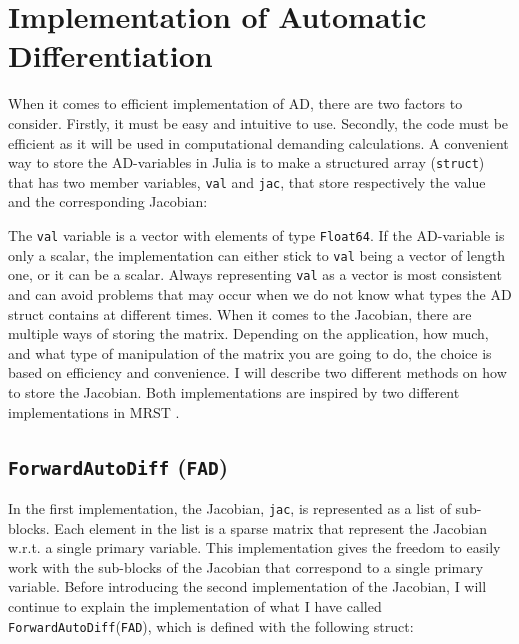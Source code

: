 \section{Implementation of Automatic Differentiation}
\label{sec:ImplementationAD}
When it comes to efficient implementation of AD, there are two factors to consider. Firstly, it must be easy and intuitive to use. Secondly, the code must be efficient as it will be used in computational demanding calculations. A convenient way to store the AD-variables in Julia is to make a structured array (\texttt{struct}) that has two member variables, \texttt{val} and \texttt{jac}, that store respectively the value and the corresponding Jacobian: 
 
The \texttt{val} variable is a vector with elements of type \texttt{Float64}. If the AD-variable is only a scalar, the implementation can either stick to \texttt{val} being a vector of length one, or it can be a scalar. Always representing \texttt{val} as a vector is most consistent and can avoid problems that may occur when we do not know what types the AD struct contains at different times. When it comes to the Jacobian, there are multiple ways of storing the matrix. Depending on the application, how much, and what type of manipulation of the matrix you are going to do, the choice is based on efficiency and convenience. I will describe two different methods on how to store the Jacobian. Both implementations are inspired by two different implementations in MRST \citep{lieMrstUrl}. 

\subsection{\texttt{ForwardAutoDiff} (\texttt{FAD})}
\label{sec:FAD}
In the first implementation, the Jacobian, \texttt{jac}, is represented as a list of sub-blocks. Each element in the list is a sparse matrix that represent the Jacobian w.r.t. a single primary variable. This implementation gives the freedom to easily work with the sub-blocks of the Jacobian that correspond to a single primary variable. Before introducing the second implementation of the Jacobian, I will continue to explain the implementation of what I have called \texttt{ForwardAutoDiff}(\texttt{FAD}), which is defined with the following struct:


